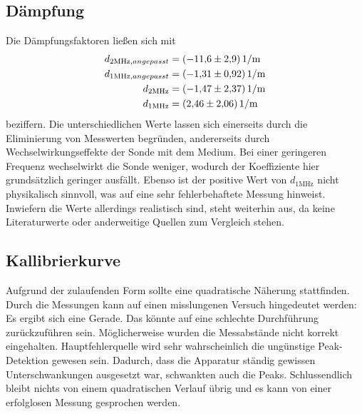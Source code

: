 \subsection{Dämpfung}
Die Dämpfungsfaktoren ließen sich mit 
\begin{align*}
    d_{2 \unit{\mega\hertz},angepasst} &= \qty{-11.6(2.9)}{1 \per\meter} \\
    d_{1 \unit{\mega\hertz},angepasst} &= \qty{-1.31(0.92)}{1 \per\meter} \\
    d_{2 \unit{\mega\hertz}} &= \qty{-1.47 \pm 2.37}{1 \per\meter} \\
    d_{1 \unit{\mega\hertz}} &= \qty{2.46 \pm 2.06}{1 \per\meter}
\end{align*}
beziffern. Die unterschiedlichen Werte lassen sich einerseits durch die Eliminierung 
von Messwerten begründen, andererseits durch Wechselwirkungseffekte der Sonde 
mit dem Medium. Bei einer geringeren Frequenz wechselwirkt die Sonde weniger, 
wodurch der Koeffiziente hier grundsätzlich geringer ausfällt. Ebenso ist der 
positive Wert von $d_{1 \unit{\mega\hertz}}$ nicht physikalisch sinnvoll, was 
auf eine sehr fehlerbehaftete Messung hinweist. Inwiefern die Werte allerdings 
realistisch sind, steht weiterhin aus, da keine Literaturwerte oder anderweitige 
Quellen zum Vergleich stehen.

\subsection{Kallibrierkurve}
Aufgrund der zulaufenden Form sollte eine quadratische Näherung stattfinden. 
Durch die Messungen kann auf einen misslungenen Versuch hingedeutet werden: 
Es ergibt sich eine Gerade. Das könnte auf eine schlechte Durchführung 
zurückzuführen sein. Möglicherweise wurden die Messabstände nicht korrekt eingehalten.
Hauptfehlerquelle wird sehr wahrscheinlich die ungünstige Peak-Detektion gewesen 
sein. Dadurch, dass die Apparatur ständig gewissen Unterschwankungen ausgesetzt 
war, schwankten auch die Peaks. Schlussendlich bleibt nichts von einem 
quadratischen Verlauf übrig und es kann von einer erfolglosen Messung gesprochen 
werden.